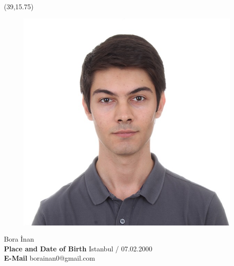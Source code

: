 \vspace*{10mm}
\setlength{\TPHorizModule}{10pt}
\setlength{\TPVertModule}{10pt}
\begin{textblock}{1}(39,15.75) %
	\begin{figure}[p]
		\includegraphics[scale=0.2,keepaspectratio=true]{cv-photo/bora.jpeg}
	\end{figure}	
\end{textblock}
\vspace*{20mm}
\textbf{\makebox[1.6cm]{\hfill \textbf{:}}}\hspace{0.225em} Bora İnan \\ %

\textbf{Place and Date of Birth\makebox[0.735cm]{\hfill \textbf{:}}}\hspace{0.225em} Istanbul / 07.02.2000\\ %

\textbf{E-Mail\makebox[3.685cm]{\hfill \textbf{:}}}\hspace{0.225em} borainan0@gmail.com\\ %

\vspace{5mm}

